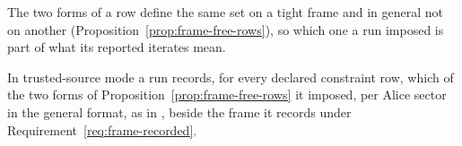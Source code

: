
The two forms of a row define the same set on a tight frame and in general
not on another (Proposition~\ref{prop:frame-free-rows}), so which one a run imposed is part
of what its reported iterates mean.

\begin{requirement}\label{req:row-form-record}
In trusted-source mode a run records, for every declared constraint row,
which of the two forms of Proposition~\ref{prop:frame-free-rows} it
imposed, per Alice sector in the general format, as
 in , beside the
frame it records under Requirement~\ref{req:frame-recorded}.
\end{requirement}
